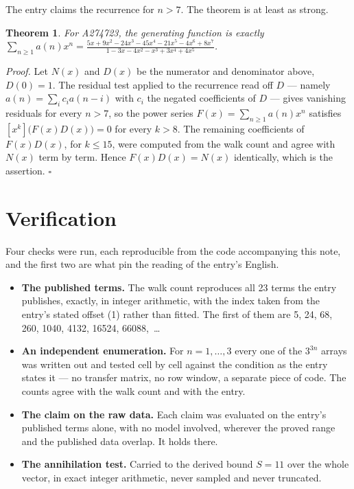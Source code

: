 \documentclass[11pt]{article}
\newtheorem{theorem}{Theorem}
\theoremstyle{definition}
\begin{document}
The entry claims the recurrence for $n > 7$. The theorem is at least as strong.

\begin{theorem} For A274723, the generating function is exactly $\sum_{n\ge 1} a(n)x^n = \frac{5x + 9x^{2} - 24x^{3} - 45x^{4} - 21x^{5} - 4x^{6} + 8x^{7}}{1 - 3x - 4x^{2} - x^{3} + 3x^{4} + 4x^{5}}$.\end{theorem}

{\itshape Proof.} Let $N(x)$ and $D(x)$ be the numerator and denominator above, $D(0)=1$. The residual test applied to the recurrence read off $D$ --- namely $a(n) = \sum_i c_i a(n-i)$ with $c_i$ the negated coefficients of $D$ --- gives vanishing residuals for every $n > 7$, so the power series $F(x)=\sum_{n\ge 1}a(n)x^n$ satisfies $[x^k]\bigl(F(x)D(x)\bigr) = 0$ for every $k > 8$. The remaining coefficients of $F(x)D(x)$, for $k \le 15$, were computed from the walk count and agree with $N(x)$ term by term. Hence $F(x)D(x) = N(x)$ identically, which is the assertion. $\square$

\section{Verification}

Four checks were run, each reproducible from the code accompanying this note, and the first two are what pin the reading of the entry's English.

\begin{itemize}

\item {\bfseries The published terms.} The walk count reproduces all 23 terms the entry publishes, exactly, in integer arithmetic, with the index taken from the entry's stated offset (1) rather than fitted. The first of them are 5, 24, 68, 260, 1040, 4132, 16524, 66088,~\dots

\item {\bfseries An independent enumeration.} For $n = 1,\dots,3$ every one of the $3^{3n}$ arrays was written out and tested cell by cell against the condition as the entry states it --- no transfer matrix, no row window, a separate piece of code. The counts agree with the walk count and with the entry.

\item {\bfseries The claim on the raw data.} Each claim was evaluated on the entry's published terms alone, with no model involved, wherever the proved range and the published data overlap. It holds there.

\item {\bfseries The annihilation test.} Carried to the derived bound $S = 11$ over the whole vector, in exact integer arithmetic, never sampled and never truncated.

\end{itemize}
\end{document}
